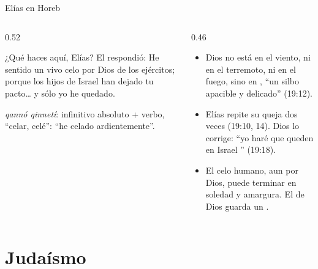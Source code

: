 \begin{frame}{Elías en Horeb}
\begin{columns}[t,onlytextwidth]
\begin{column}{0.52\textwidth}
\begin{cita}¿Qué haces aquí, Elías? El respondió: He sentido un vivo celo por \SENOR{} Dios de los ejércitos; porque los hijos de Israel han dejado tu pacto\ldots{} y sólo yo he quedado.\end{cita}
\begin{center}\end{center}
\scriptsize \emph{qannó qinnetí}: infinitivo absoluto + verbo, ``celar, celé'': ``he celado ardientemente''.
\end{column}
\begin{column}{0.46\textwidth}\small
\begin{itemize}
\item Dios no está en el viento, ni en el terremoto, ni en el fuego, sino en , ``un silbo apacible y delicado'' (19:12).
\item Elías repite su queja dos veces (19:10, 14). Dios lo corrige: ``yo haré que queden en Israel '' (19:18).
\item El celo humano, aun por Dios, puede terminar en soledad y amargura. El de Dios guarda un .
\end{itemize}
\end{column}
\end{columns}
\end{frame}

\section{Judaísmo}

